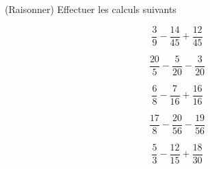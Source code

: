  (Raisonner) Effectuer les calculs suivants

\begin{multicols}{5}
$$\dfrac{3}{9}-\dfrac{14}{45}+\dfrac{12}{45}$$

$$\dfrac{20}{5}-\dfrac{5}{20}-\dfrac{3}{20}$$

$$\dfrac{6}{8}-\dfrac{7}{16}+\dfrac{16}{16}$$

$$\dfrac{17}{8}-\dfrac{20}{56}-\dfrac{19}{56}$$

$$\dfrac{5}{3}-\dfrac{12}{15}+\dfrac{18}{30}$$

\end{multicols}